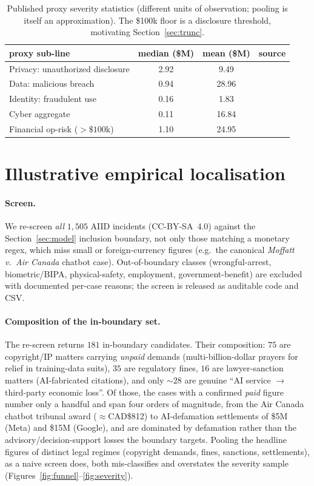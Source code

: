 \documentclass[11pt]{article}
\begin{document}
\begin{table}[h]\centering
\begin{tabular}{lccc}
\toprule
proxy sub-line & median (\$M) & mean (\$M) & source\\
\midrule
Privacy: unauthorized disclosure & 2.92 & 9.49  & \citet{malavasi2021}\\
Data: malicious breach           & 0.94 & 28.96 & \citet{malavasi2021}\\
Identity: fraudulent use         & 0.16 & 1.83  & \citet{malavasi2021}\\
Cyber aggregate                  & 0.11 & 16.84 & \citet{cremer2023}\\
Financial op-risk ($>\$100$k)    & 1.10 & 24.95 & \citet{elingjung2022}\\
\bottomrule
\end{tabular}
\caption{Published proxy severity statistics (different units of observation; pooling is itself
an approximation). The \$100k floor is a disclosure threshold, motivating Section~\ref{sec:trunc}.}
\label{tab:priors}
\end{table}

\section{Illustrative empirical localisation}\label{sec:empirical}
\paragraph{Screen.} We re-screen \emph{all} $1{,}505$ AIID incidents (CC-BY-SA~4.0) against the
Section~\ref{sec:model} inclusion boundary, not only those matching a monetary regex, which
miss small or foreign-currency figures (e.g.\ the canonical \emph{Moffatt v.\ Air Canada}
chatbot case). Out-of-boundary classes (wrongful-arrest, biometric/BIPA, physical-safety,
employment, government-benefit) are excluded with documented per-case reasons; the screen is
released as auditable code and CSV.

\paragraph{Composition of the in-boundary set.} The
re-screen returns $181$ in-boundary candidates. Their composition: $75$ are
copyright/IP matters carrying \emph{unpaid} demands (multi-billion-dollar prayers for relief in
training-data suits), $35$ are regulatory fines, $16$ are lawyer-sanction matters (AI-fabricated
citations), and only $\sim$$28$ are genuine ``AI service $\to$ third-party economic loss''. Of
those, the cases with a confirmed \emph{paid} figure number only a handful and span four orders
of magnitude, from the Air Canada chatbot tribunal award ($\approx$CAD\$812) to AI-defamation
settlements of \$5M (Meta) and \$15M (Google), and are dominated by defamation rather than the
advisory/decision-support losses the boundary targets. Pooling the headline figures of distinct
legal regimes (copyright demands, fines, sanctions, settlements), as a naive screen does, both
mis-classifies and overstates the severity sample (Figures~\ref{fig:funnel}--\ref{fig:severity}).
\end{document}
